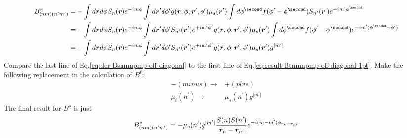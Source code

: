 \documentclass [10pt,letterpaper]{article}
\begin{document}
\begin{equation} \label{eq:der-Bsnmnpmp-off-diagonal}
	\begin{split}
		B^s_{(n m)(n^\prime m^\prime)}
		=&
		-\int d\vectorsym{r} d\phi
		S_n(\vectorsym{r})
		e^{-i m \phi}
		\int d\vectorsym{r}^\prime d\phi^\prime
		g(\vectorsym{r},\phi;\vectorsym{r}^\prime,\phi^\prime)
		\mu_s(\vectorsym{r}^\prime)
		\int d\phi^\second
		f(\phi^\prime-\phi^\second)
		S_{n^\prime}(\vectorsym{r}^\prime)
		e^{+i m^\prime \phi^\second}
		\\
		=&
		-\int d\vectorsym{r} d\phi
		S_n(\vectorsym{r})
		e^{-i m \phi}
		\int d\vectorsym{r}^\prime d\phi^\prime
		S_{n^\prime}(\vectorsym{r}^\prime)
		e^{+i m^\prime \phi^\prime}
		g(\vectorsym{r},\phi;\vectorsym{r}^\prime,\phi^\prime)
		\mu_s(\vectorsym{r}^\prime)
		\int d\phi^\second
		f(\phi^\prime-\phi^\second)
		e^{+i m^\prime (\phi^\second-\phi^\prime)}
		\\
		=&
		-\int d\vectorsym{r} d\phi
		S_n(\vectorsym{r})
		e^{-i m \phi}
		\int d\vectorsym{r}^\prime d\phi^\prime
		S_{n^\prime}(\vectorsym{r}^\prime)
		e^{+i m^\prime \phi^\prime}
		g(\vectorsym{r},\phi;\vectorsym{r}^\prime,\phi^\prime)
		\mu_s(\vectorsym{r}^\prime)
		g^{\lvert m^\prime \rvert}
	\end{split}
\end{equation}
Compare the last line of Eq.\eqref{eq:der-Bsnmnpmp-off-diagonal} to the first line of Eq.\eqref{eq:result-Btnmnpmp-off-diagonal-1pt}. Make the following replacement in the calculation of $B^t$:
\begin{align*}
	-(minus)	 \rightarrow & +(plus)
	\\
	\mu_t(n^\prime)	 \rightarrow & \mu_s(n^\prime)g^{\lvert m^\prime \rvert}
\end{align*}
The final result for $B^s$ is just
\begin{equation} \label{eq:result-Bsnmnpmp-off-diagonal-1pt}
	B^s_{(n m)(n^\prime m^\prime)}
	=
	-
	\mu_s(n^\prime)g^{\lvert m^\prime \rvert} 
	\frac{S(n) S(n^\prime)}{\lvert\vectorsym{r}_n-\vectorsym{r}_{n^\prime}\rvert}
	e^{-i (m-m^\prime) \phi_{\vectorsym{r}_n-\vectorsym{r}_{n^\prime}}}
\end{equation}
\end{document}
